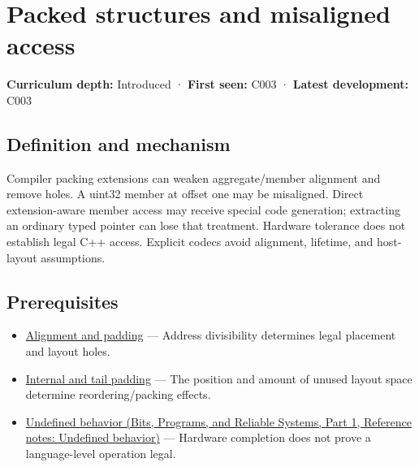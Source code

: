\hypertarget{appendix-0682dbfc5f0e}{}\label{referencestart:appendix-0682dbfc5f0e}
\section{Packed structures and misaligned access}\label{appendix-0682dbfc5f0e-packed-structures-and-misaligned-access}

\hypertarget{appendix-0682dbfc5f0e-packed-structures-and-misaligned-access}{}

\textbf{Curriculum depth:} Introduced · \textbf{First seen:} C003 · \textbf{Latest development:} C003

\begin{allmightroledefinition}

\subsection{Definition and mechanism}\label{appendix-0682dbfc5f0e-definition-and-mechanism}

\hypertarget{appendix-0682dbfc5f0e-definition-and-mechanism}{}

Compiler packing extensions can weaken aggregate/member alignment and remove holes. A uint32 member at offset one may be misaligned. Direct extension-aware member access may receive special code generation; extracting an ordinary typed pointer can lose that treatment. Hardware tolerance does not establish legal C++ access. Explicit codecs avoid alignment, lifetime, and host-layout assumptions.

\end{allmightroledefinition}

\subsection{Prerequisites}\label{appendix-0682dbfc5f0e-prerequisites}

\hypertarget{appendix-0682dbfc5f0e-prerequisites}{}

\begin{itemize}
\tightlist
\item
  \hyperref[appendix-a1f7c53b4742]{Alignment and padding} --- Address divisibility determines legal placement and layout holes.
\item
  \hyperref[appendix-f52f8c5a3afd]{Internal and tail padding} --- The position and amount of unused layout space determine reordering/packing effects.
\item
  \href{../01-Bits-Programs-and-Reliable-Systems-P01/main.pdf\#appendix-f558f5b4d8f2}{Undefined behavior (Bits, Programs, and Reliable Systems, Part 1, Reference notes: Undefined behavior)} --- Hardware completion does not prove a language-level operation legal.
\end{itemize}

